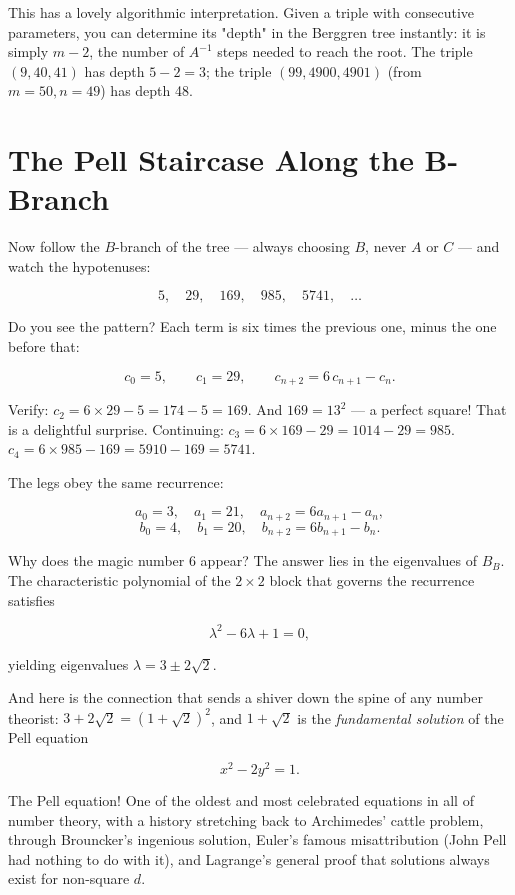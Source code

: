 This has a lovely algorithmic interpretation. Given a triple with consecutive parameters, you can determine its "depth" in the Berggren tree instantly: it is simply $m - 2$, the number of $A^{-1}$ steps needed to reach the root. The triple $(9, 40, 41)$ has depth $5 - 2 = 3$; the triple $(99, 4900, 4901)$ (from $m = 50, n = 49$) has depth 48.

\bigskip

\section*{The Pell Staircase Along the B-Branch}

Now follow the $B$-branch of the tree --- always choosing $B$, never $A$ or $C$ --- and watch the hypotenuses:

\[
5, \quad 29, \quad 169, \quad 985, \quad 5741, \quad \ldots
\]

Do you see the pattern? Each term is six times the previous one, minus the one before that:

\[
c_0 = 5, \qquad c_1 = 29, \qquad c_{n+2} = 6\,c_{n+1} - c_n.
\]

Verify: $c_2 = 6 \times 29 - 5 = 174 - 5 = 169$. And $169 = 13^2$ --- a perfect square! That is a delightful surprise. Continuing: $c_3 = 6 \times 169 - 29 = 1014 - 29 = 985$. $c_4 = 6 \times 985 - 169 = 5910 - 169 = 5741$.

The legs obey the same recurrence:

\[
a_0 = 3,\quad a_1 = 21,\quad a_{n+2} = 6a_{n+1} - a_n,
\]
\[
b_0 = 4,\quad b_1 = 20,\quad b_{n+2} = 6b_{n+1} - b_n.
\]

Why does the magic number $6$ appear? The answer lies in the eigenvalues of $B_B$. The characteristic polynomial of the $2 \times 2$ block that governs the recurrence satisfies

\[
\lambda^2 - 6\lambda + 1 = 0,
\]

yielding eigenvalues $\lambda = 3 \pm 2\sqrt{2}$.

And here is the connection that sends a shiver down the spine of any number theorist: $3 + 2\sqrt{2} = (1 + \sqrt{2})^2$, and $1 + \sqrt{2}$ is the \textit{fundamental solution} of the Pell equation

\[
x^2 - 2y^2 = 1.
\]

The Pell equation! One of the oldest and most celebrated equations in all of number theory, with a history stretching back to Archimedes' cattle problem, through Brouncker's ingenious solution, Euler's famous misattribution (John Pell had nothing to do with it), and Lagrange's general proof that solutions always exist for non-square $d$.

